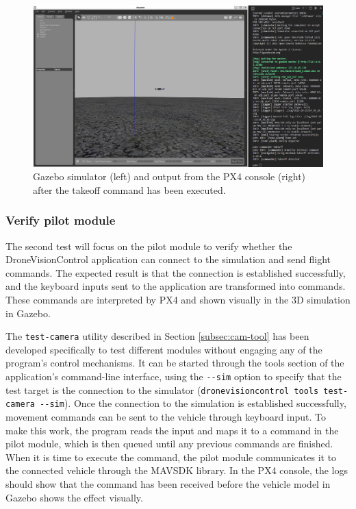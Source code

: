 \begin{figure}[H]
  \centering
  \includegraphics[width=\textwidth, keepaspectratio]{img/gazebo-takeoff.png}
  \caption{Gazebo simulator (left) and output from the PX4 console (right) after the takeoff command has been executed.}
  \label{fig:gazebo-takeoff}
\end{figure}


\subsubsection{Verify pilot module}

The second test will focus on the pilot module to verify whether the DroneVisionControl application can connect to the simulation and send flight commands. The expected result is that the connection is established successfully, and the keyboard inputs sent to the application are transformed into commands. These commands are interpreted by PX4 and shown visually in the 3D simulation in Gazebo.

The \texttt{test-camera} utility described in Section \ref{subsec:cam-tool} has been developed specifically to test different modules without engaging any of the program's control mechanisms. It can be started through the tools section of the application's command-line interface, using the \texttt{-{}-sim} option to specify that the test target is the connection to the simulator (\texttt{dronevisioncontrol tools test-camera -{}-sim}).
Once the connection to the simulation is established successfully, movement commands can be sent to the vehicle through keyboard input. To make this work, the program reads the input and maps it to a command in the pilot module, which is then queued until any previous commands are finished. When it is time to execute the command, the pilot module communicates it to the connected vehicle through the MAVSDK library. In the PX4 console, the logs should show that the command has been received before the vehicle model in Gazebo shows the effect visually.


